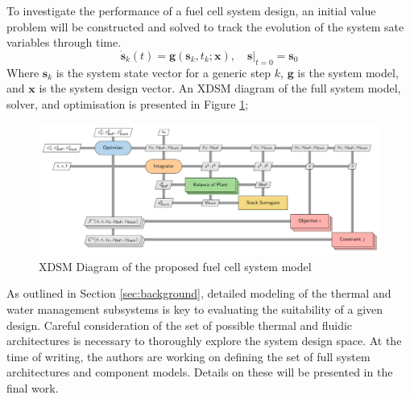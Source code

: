 To investigate the performance of a fuel cell system design, an initial value problem will be constructed and solved to track the evolution of the system sate variables through time.
\begin{equation}
	\dot{\bm{s}}_k(t) = \bm{g}(\bm{s}_k, t_k; \bm{x}), \quad \bm{s}|_{t=0} = \bm{s}_0
\end{equation}
Where \(\bm{s}_k\) is the system state vector for a generic step \(k\), \(\bm{g}\) is the system model, and \(\bm{x}\) is the system design vector. An XDSM diagram of the full system model, solver, and optimisation is presented in Figure \ref{fig:xdsm};
\begin{center}
	\begin{figure}[h]
		\includegraphics[width=\linewidth]{figures/xdsm.pdf}
		\caption{XDSM Diagram of the proposed fuel cell system model}
		\label{fig:xdsm}
	\end{figure}
\end{center}
As outlined in Section \ref{sec:background}, detailed modeling of the thermal and water management subsystems is key to evaluating the suitability of a given design.
Careful consideration of the set of possible thermal and fluidic architectures is necessary to thoroughly explore the system design space.
At the time of writing, the authors are working on defining the set of full system architectures and component models.
Details on these will be presented in the final work.

